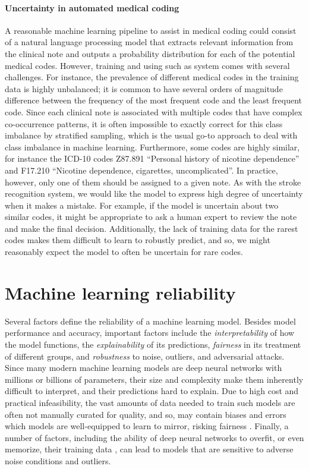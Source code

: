 \paragraph{Uncertainty in automated medical coding} A reasonable machine learning pipeline to assist in medical coding could consist of a natural language processing model that extracts relevant information from the clinical note and outputs a probability distribution for each of the potential medical codes. 
However, training and using such as system comes with several challenges. 
For instance, the prevalence of different medical codes in the training data is highly unbalanced; it is common to have several orders of magnitude difference between the frequency of the most frequent code and the least frequent code. Since each clinical note is associated with multiple codes that have complex co-occurrence patterns, it is often impossible to exactly correct for this class imbalance by stratified sampling, which is the usual go-to approach to deal with class imbalance in machine learning. 
Furthermore, some codes are highly similar, for instance the ICD-10 codes Z87.891 ``Personal history of nicotine dependence'' and F17.210 ``Nicotine dependence, cigarettes, uncomplicated''. In practice, however, only one of them should be assigned to a given note. 
As with the stroke recognition system, we would like the model to express high degree of uncertainty when it makes a mistake. For example, if the model is uncertain about two similar codes, it might be appropriate to ask a human expert to review the note and make the final decision. Additionally, the lack of training data for the rarest codes makes them difficult to learn to robustly predict, and so, we might reasonably expect the model to often be uncertain for rare codes. 


\section{Machine learning reliability} \label{sec:machine-learning-reliability}
%
Several factors define the reliability of a machine learning model. 
Besides model performance and accuracy, important factors include the \emph{interpretability} of how the model functions, the \emph{explainability} of its predictions, \emph{fairness} in its treatment of different groups, and \emph{robustness} to noise, outliers, and adversarial attacks. 
Since many modern machine learning models are deep neural networks with millions or billions of parameters, their size and complexity make them inherently difficult to interpret, and their predictions hard to explain. 
Due to high cost and practical infeasibility, the vast amounts of data needed to train such models are often not manually curated for quality, and so, may contain biases and errors which models are well-equipped to learn to mirror, risking fairness \parencite{burkart_survey_2021}. 
Finally, a number of factors, including the ability of deep neural networks to overfit, or even memorize, their training data \parencite{arpit_closer_2017, burg_memorization_2021}, can lead to models that are sensitive to adverse noise conditions and outliers. 

